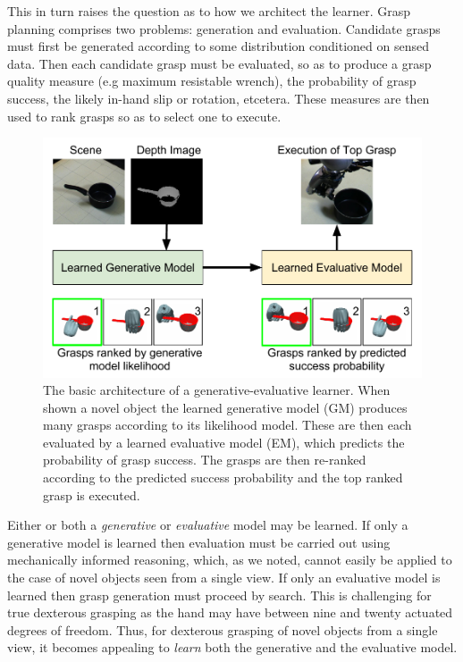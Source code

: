 This in turn raises the question as to how we architect the learner. Grasp planning comprises two problems: generation and evaluation. Candidate grasps must first be generated according to some distribution conditioned on sensed data. Then each candidate grasp must be evaluated, so as to produce a grasp quality measure (e.g maximum resistable wrench), the probability of grasp success, the likely in-hand slip or rotation, etcetera. These measures are then used to rank grasps so as to select one to execute.
\begin{figure}[t]
\begin{center}
  \includegraphics[width=\columnwidth]{images/contribution.pdf}
  \end{center}
  \caption{The basic architecture of a generative-evaluative learner. When shown a novel object the learned generative model (GM) produces many grasps according to its likelihood model. These are then each evaluated by a learned evaluative model (EM), which predicts the probability of grasp success. The grasps are then re-ranked according to the predicted success probability and the top ranked grasp is executed.}
\label{fig:systemArchitecture}
\end{figure}
Either or both a {\em generative} or {\em evaluative} model may be learned. If only a generative model is learned then evaluation must be carried out using mechanically informed reasoning, which, as we noted, cannot easily be applied to the case of novel objects seen from a single view. If only an evaluative model is learned then grasp generation must proceed by search. This is challenging for true dexterous grasping as the hand may have between nine and twenty actuated degrees of freedom. Thus, for dexterous grasping of novel objects from a single view, it becomes appealing to {\em learn} both the generative and the evaluative model. 


